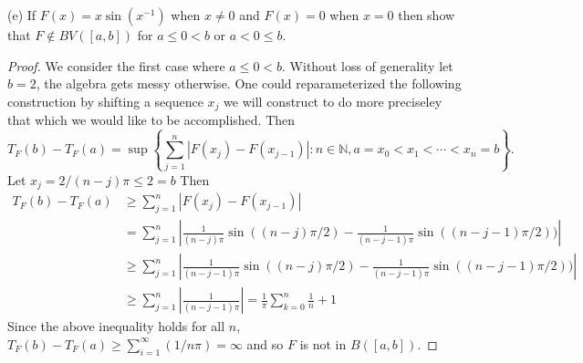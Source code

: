 \documentclass[11pt]{amsart}
\theoremstyle{definition}
\numberwithin{theorem}{section}
\numberwithin{definition}{section}
\numberwithin{equation}{section}
\begin{document}
(e) If $F(x) = x\sin(x^{-1})$ when $x \neq 0$ and $F(x) = 0$ when $x = 0$ then show that $F \notin BV([a,b])$ for $a \leq 0 < b$ or $a < 0 \leq b$.
\begin{proof}
	We consider the first case where $a \leq 0 < b$. Without loss of generality let $b = 2$, the algebra gets messy otherwise. 
	One could reparameterized the following construction by shifting a sequence $x_j$ we will construct to do more preciseley that which we would like to be accomplished. Then 
	\begin{equation*}
	 	T_F(b) - T_F(a) = \sup\left\{ \sum_{j=1}^n |F(x_j) - F(x_{j-1}) |: n \in\mathbb{N},  a=  x_0 < x_1 < \cdots < x_n = b \right\}.
	 \end{equation*} 
	 Let $x_{j} = 2/{(n-j)\pi} \leq 2 = b$ Then 
	 \begin{equation*}
	 \begin{aligned}
	 	T_F(b) - T_F(a) &\geq \sum_{j=1}^n |F(x_j) - F(x_{j-1})|\\
	 	&= \sum_{j=1}^n \left|\frac{1}{{(n-j)\pi}} \sin((n-j)\pi/2)  - \frac{1}{{(n-j-1)\pi}} \sin((n-j-1)\pi/2))\right| \\
	 	&\geq \sum_{j=1}^n \left|\frac{1}{{(n-j-1)\pi}} \sin((n-j)\pi/2)  - \frac{1}{{(n-j-1)\pi}} \sin((n-j-1)\pi/2))\right| \\
	 	&\geq  \sum_{j=1}^n  \left|\frac{1}{{(n-j-1)\pi}}\right| = \frac{1}{\pi}\sum_{k=0}^{n} \frac{1}{n} + 1
	 \end{aligned}
	 \end{equation*}
	 Since the above inequality holds for all $n$, $T_F(b) - T_F(a) \geq \sum_{i=1}^\infty (1/n\pi)  = \infty$ and so $F$ is not in $B([a,b]).$


\end{proof}
\end{document}
